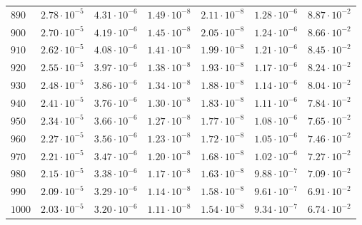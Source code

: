 \begin{table}
\begin{tabular}{lcccccc}
$890 $&$ 2.78\cdot 10^{-5}  $&$ 4.31\cdot 10^{-6}  $&$ 1.49\cdot 10^{-8}  $&$ 2.11\cdot 10^{-8}  $&$ 1.28\cdot 10^{-6}  $&$ 8.87\cdot 10^{-2}  $\\
$900 $&$ 2.70\cdot 10^{-5}  $&$ 4.19\cdot 10^{-6}  $&$ 1.45\cdot 10^{-8}  $&$ 2.05\cdot 10^{-8}  $&$ 1.24\cdot 10^{-6}  $&$ 8.66\cdot 10^{-2}  $\\
$910 $&$ 2.62\cdot 10^{-5}  $&$ 4.08\cdot 10^{-6}  $&$ 1.41\cdot 10^{-8}  $&$ 1.99\cdot 10^{-8}  $&$ 1.21\cdot 10^{-6}  $&$ 8.45\cdot 10^{-2}  $\\
$920 $&$ 2.55\cdot 10^{-5}  $&$ 3.97\cdot 10^{-6}  $&$ 1.38\cdot 10^{-8}  $&$ 1.93\cdot 10^{-8}  $&$ 1.17\cdot 10^{-6}  $&$ 8.24\cdot 10^{-2}  $\\
$930 $&$ 2.48\cdot 10^{-5}  $&$ 3.86\cdot 10^{-6}  $&$ 1.34\cdot 10^{-8}  $&$ 1.88\cdot 10^{-8}  $&$ 1.14\cdot 10^{-6}  $&$ 8.04\cdot 10^{-2}  $\\
$940 $&$ 2.41\cdot 10^{-5}  $&$ 3.76\cdot 10^{-6}  $&$ 1.30\cdot 10^{-8}  $&$ 1.83\cdot 10^{-8}  $&$ 1.11\cdot 10^{-6}  $&$ 7.84\cdot 10^{-2}  $\\
$950 $&$ 2.34\cdot 10^{-5}  $&$ 3.66\cdot 10^{-6}  $&$ 1.27\cdot 10^{-8}  $&$ 1.77\cdot 10^{-8}  $&$ 1.08\cdot 10^{-6}  $&$ 7.65\cdot 10^{-2}  $\\
$960 $&$ 2.27\cdot 10^{-5}  $&$ 3.56\cdot 10^{-6}  $&$ 1.23\cdot 10^{-8}  $&$ 1.72\cdot 10^{-8}  $&$ 1.05\cdot 10^{-6}  $&$ 7.46\cdot 10^{-2}  $\\
$970 $&$ 2.21\cdot 10^{-5}  $&$ 3.47\cdot 10^{-6}  $&$ 1.20\cdot 10^{-8}  $&$ 1.68\cdot 10^{-8}  $&$ 1.02\cdot 10^{-6}  $&$ 7.27\cdot 10^{-2}  $\\
$980 $&$ 2.15\cdot 10^{-5}  $&$ 3.38\cdot 10^{-6}  $&$ 1.17\cdot 10^{-8}  $&$ 1.63\cdot 10^{-8}  $&$ 9.88\cdot 10^{-7}  $&$ 7.09\cdot 10^{-2}  $\\
$990 $&$ 2.09\cdot 10^{-5}  $&$ 3.29\cdot 10^{-6}  $&$ 1.14\cdot 10^{-8}  $&$ 1.58\cdot 10^{-8}  $&$ 9.61\cdot 10^{-7}  $&$ 6.91\cdot 10^{-2}  $\\
$1000 $&$ 2.03\cdot 10^{-5}  $&$ 3.20\cdot 10^{-6}  $&$ 1.11\cdot 10^{-8}  $&$ 1.54\cdot 10^{-8}  $&$ 9.34\cdot 10^{-7}  $&$ 6.74\cdot 10^{-2}  $\\
\hline
  \end{tabular}
\end{table}

